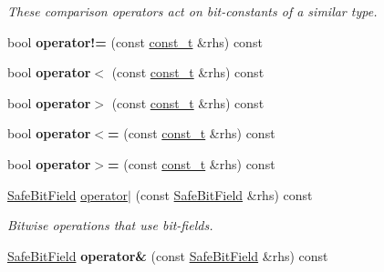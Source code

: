 \begin{DoxyCompactItemize}
\begin{DoxyCompactList}\small\item\em These comparison operators act on bit-\/constants of a similar type. \end{DoxyCompactList}\item 
\hypertarget{classLoki_1_1SafeBitField_a4eeee57bec9c6389ebc6da5d158fa201}{}bool {\bfseries operator!=} (const \hyperlink{classLoki_1_1SafeBitField_aa8ac2761b53243b4648a61263ef91665}{const\+\_\+t} \&rhs) const \label{classLoki_1_1SafeBitField_a4eeee57bec9c6389ebc6da5d158fa201}

\item 
\hypertarget{classLoki_1_1SafeBitField_ac13f575aa467605b924300dbbbf1552d}{}bool {\bfseries operator$<$} (const \hyperlink{classLoki_1_1SafeBitField_aa8ac2761b53243b4648a61263ef91665}{const\+\_\+t} \&rhs) const \label{classLoki_1_1SafeBitField_ac13f575aa467605b924300dbbbf1552d}

\item 
\hypertarget{classLoki_1_1SafeBitField_a130174883e3e1ff364fc194f0709954f}{}bool {\bfseries operator$>$} (const \hyperlink{classLoki_1_1SafeBitField_aa8ac2761b53243b4648a61263ef91665}{const\+\_\+t} \&rhs) const \label{classLoki_1_1SafeBitField_a130174883e3e1ff364fc194f0709954f}

\item 
\hypertarget{classLoki_1_1SafeBitField_a092b427051c52a0da2c55bb719d8d457}{}bool {\bfseries operator$<$=} (const \hyperlink{classLoki_1_1SafeBitField_aa8ac2761b53243b4648a61263ef91665}{const\+\_\+t} \&rhs) const \label{classLoki_1_1SafeBitField_a092b427051c52a0da2c55bb719d8d457}

\item 
\hypertarget{classLoki_1_1SafeBitField_a5cbffb341691df7dd717c36d34aa2cda}{}bool {\bfseries operator$>$=} (const \hyperlink{classLoki_1_1SafeBitField_aa8ac2761b53243b4648a61263ef91665}{const\+\_\+t} \&rhs) const \label{classLoki_1_1SafeBitField_a5cbffb341691df7dd717c36d34aa2cda}

\item 
\hypertarget{classLoki_1_1SafeBitField_a780329e4ab1619ce91cc5848c28c5e3e}{}\hyperlink{classLoki_1_1SafeBitField}{Safe\+Bit\+Field} \hyperlink{classLoki_1_1SafeBitField_a780329e4ab1619ce91cc5848c28c5e3e}{operator$\vert$} (const \hyperlink{classLoki_1_1SafeBitField}{Safe\+Bit\+Field} \&rhs) const \label{classLoki_1_1SafeBitField_a780329e4ab1619ce91cc5848c28c5e3e}

\begin{DoxyCompactList}\small\item\em Bitwise operations that use bit-\/fields. \end{DoxyCompactList}\item 
\hypertarget{classLoki_1_1SafeBitField_a5ae73fe4e57b861ae29b84b75eda613b}{}\hyperlink{classLoki_1_1SafeBitField}{Safe\+Bit\+Field} {\bfseries operator\&} (const \hyperlink{classLoki_1_1SafeBitField}{Safe\+Bit\+Field} \&rhs) const \label{classLoki_1_1SafeBitField_a5ae73fe4e57b861ae29b84b75eda613b}


\end{DoxyCompactItemize}

